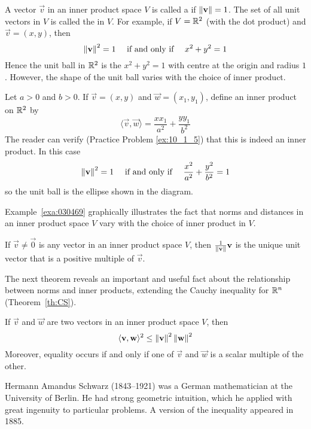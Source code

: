 \documentclass{ximera}
\begin{document}
A vector $\vec{v}$ in an inner product space $V$ is called a  if $\left\lVert\mathbf{v}\right\rVert = 1$. The set of all unit vectors in $V$ is called the  in $V$. For example, if $V = \mathbb{R}^2$ (with the dot product) and $\vec{v} = (x, y)$, then
\begin{equation*}
\left\lVert \mathbf{v} \right\rVert^2 = 1 \quad \mbox{ if and only if } \quad x^2 + y^2 = 1
\end{equation*}
Hence the unit ball in $\mathbb{R}^2$ is the  $x^{2} + y^{2} = 1$ with centre at the origin and radius $1$. However, the shape of the unit ball varies with the choice of inner product.

\begin{example}\label{030469}


Let $a > 0$ and $b > 0$. If $\vec{v} = (x, y)$ and $\vec{w} = (x_{1}, y_{1})$, define an inner product on $\mathbb{R}^2$ by
\begin{equation*}
\langle \vec{v}, \vec{w} \rangle = \frac{xx_1}{a^2} + \frac{yy_1}{b^2}
\end{equation*}
The reader can verify (Practice Problem \ref{ex:10_1_5}) that this is indeed an inner product. In this case
\begin{equation*}
\left\lVert \mathbf{v} \right\rVert^2 = 1 \quad \mbox{ if and only if } \quad \frac{x^2}{a^2} + \frac{y^2}{b^2} = 1
\end{equation*}
so the unit ball is the ellipse shown in the diagram.
\end{example}

Example~\ref{exa:030469} graphically illustrates the fact that norms and distances in an inner product space $V$ vary with the choice of inner product in $V$.

\begin{theorem}\label{030480}
If $\vec{v} \neq \vec{0}$ is any vector in an inner product space $V$, then $\frac{1}{\left\lVert \mathbf{v} \right\rVert} \mathbf{v}$ is the unique unit vector that is a positive multiple of $\vec{v}$.
\end{theorem}

The next theorem reveals an important and useful fact about the relationship between norms and inner products, extending the Cauchy inequality for $\mathbb{R}^n$ (Theorem~\ref{th:CS}).

\begin{theorem}\label{030486}
If $\vec{v}$ and $\vec{w}$ are two vectors in an inner product space $V$, then
\begin{equation*}
\langle \mathbf{v}, \mathbf{w} \rangle^2 \leq \left\lVert \mathbf{v} \right\rVert^2 \left\lVert \mathbf{w} \right\rVert^2
\end{equation*}
Moreover, equality occurs if and only if one of $\vec{v}$ and $\vec{w}$ is a scalar multiple of the other.
\end{theorem}
\begin{remark}
   Hermann Amandus Schwarz (1843--1921) was a German mathematician at the University of Berlin. He had strong geometric intuition, which he applied with great ingenuity to particular problems. A version of the inequality appeared in 1885. 
\end{remark}
\end{document}
